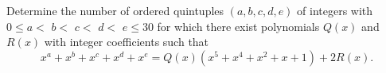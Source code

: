 Determine the number of ordered quintuples $(a,b,c,d,e)$ of integers with $0\leq a<$ $b<$ $c<$ $d<$ $e\leq 30$ for which there exist polynomials $Q(x)$ and $R(x)$ with integer coefficients such that \[x^a+x^b+x^c+x^d+x^e=Q(x)(x^5+x^4+x^2+x+1)+2R(x).\]
